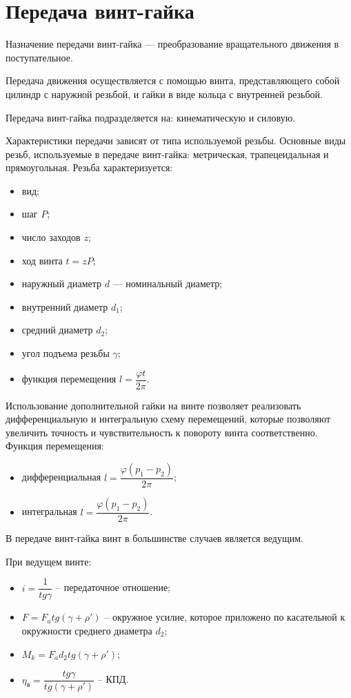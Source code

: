 
\chapter{Передача винт-гайка}
\label{ch:vint-gaika}

Назначение передачи винт-гайка --- преобразование вращательного движения в поступательное.

Передача движения осуществляется с помощью винта, представляющего собой цилиндр с наружной резьбой, и гайки в виде кольца с внутренней резьбой.

Передача винт-гайка подразделяется на: кинематическую и силовую.

Характеристики передачи зависят от типа используемой резьбы. Основные виды резьб, используемые в передаче винт-гайка: метрическая, трапецеидальная и прямоугольная.
Резьба характеризуется:
\begin{itemize}
	\item вид;
	\item шаг $ P $;
	\item число заходов $ z $;
	\item ход винта $ t = z P $;
	\item наружный диаметр $ d $ --- номинальный диаметр;
	\item внутренний диаметр $ d_1 $;
	\item средний диаметр $ d_2 $;
	\item угол подъема резьбы $ \gamma $;
	\item функция перемещения $ l = \dfrac{\varphi t}{2\pi} $.
\end{itemize}

Использование дополнительной гайки на винте позволяет реализовать дифференциальную и интегральную схему перемещений, которые позволяют увеличить точность и чувствительность к повороту винта соответственно.
Функция перемещения:
\begin{itemize}
	\item дифференциальная $ l=\dfrac{\varphi (p_1 - p_2)}{2\pi} $;
	\item интегральная $ l=\dfrac{\varphi (p_1 - p_2)}{2\pi} $.
\end{itemize}


В передаче винт-гайка винт в большинстве случаев является ведущим.

При ведущем винте:
\begin{itemize}
	\item $ i = \dfrac{1}{tg \gamma}$ -- передаточное отношение;
	\item $ F = F_a tg(\gamma + \rho') $ -- окружное усилие, которое приложено по касательной к окружности среднего диаметра $ d_2 $;
	\item $ M_k = F_a d_2 tg(\gamma + \rho')$;
	\item $ \eta_\text{в} = \dfrac{tg \gamma}{tg(\gamma + \rho')} $ -- КПД.
\end{itemize}

